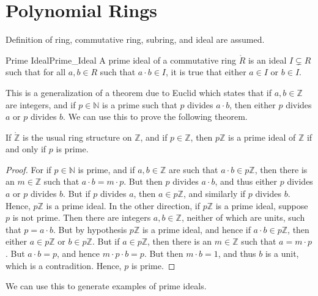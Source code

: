 \documentclass{article}                                                        %
\begin{document}
    \section{Polynomial Rings}
        Definition of ring, commutative ring, subring, and ideal are assumed.
        \begin{fdefinition}{Prime Ideal}{Prime_Ideal}
            A prime ideal of a commutative ring $\ring{R}$ is an ideal
            $I\subsetneq{R}$ such that for all $a,b\in{R}$ such that
            $a\cdot{b}\in{I}$, it is true that either $a\in{I}$ or $b\in{I}$.
        \end{fdefinition}
        This is a generalization of a theorem due to Euclid which states that if
        $a,b\in\mathbb{Z}$ are integers, and if $p\in\mathbb{N}$ is a prime such
        that $p$ divides $a\cdot{b}$, then either $p$ divides $a$ or $p$ divides
        $b$. We can use this to prove the following theorem.
        \begin{theorem}
            \label{thm:Prime_Ideals_of_Z}%
            If $\ring{\mathbb{Z}}$ is the usual ring structure on $\mathbb{Z}$,
            and if $p\in\mathbb{Z}$, then $p\mathbb{Z}$ is a prime ideal of
            $\mathbb{Z}$ if and only if $p$ is prime.
        \end{theorem}
        \begin{proof}
            For if $p\in\mathbb{N}$ is prime, and if $a,b\in\mathbb{Z}$ are such
            that $a\cdot{b}\in{p}\mathbb{Z}$, then there is an $m\in\mathbb{Z}$
            such that $a\cdot{b}=m\cdot{p}$. But then $p$ divides $a\cdot{b}$,
            and thus either $p$ divides $a$ or $p$ divides $b$. But if $p$
            divides $a$, then $a\in{p}\mathbb{Z}$, and similarly if $p$ divides
            $b$. Hence, $p\mathbb{Z}$ is a prime ideal. In the other direction,
            if $p\mathbb{Z}$ is a prime ideal, suppose $p$ is not prime. Then
            there are integers $a,b\in\mathbb{Z}$, neither of which are units,
            such that $p=a\cdot{b}$. But by hypothesis $p\mathbb{Z}$ is a prime
            ideal, and hence if $a\cdot{b}\in{p}\mathbb{Z}$, then either
            $a\in{p}\mathbb{Z}$ or $b\in{p}\mathbb{Z}$. But if
            $a\in{p}\mathbb{Z}$, then there is an $m\in\mathbb{Z}$ such that
            $a=m\cdot{p}$. But $a\cdot{b}=p$, and hence $m\cdot{p}\cdot{b}=p$.
            But then $m\cdot{b}=1$, and thus $b$ is a unit, which is a
            contradition. Hence, $p$ is prime.
        \end{proof}
        We can use this to generate examples of prime ideals.
\end{document}
